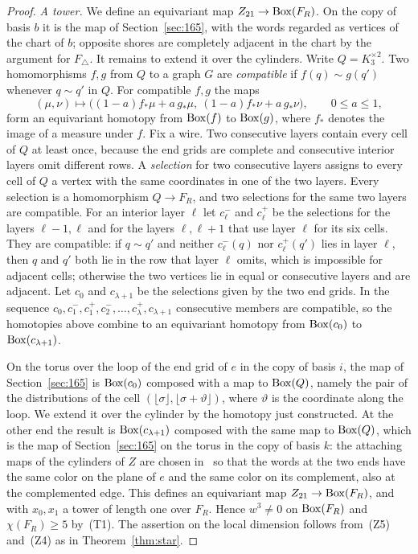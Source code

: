 \begin{proof}
\emph{A tower.} We define an equivariant map $Z_{21}\to\operatorname{Box}(F_R)$. On the copy of basis $b$ it is the map of Section~\ref{sec:165}, with the words regarded as vertices of the chart of $b$; opposite shores are completely adjacent in the chart by the argument for $F_\triangle$. It remains to extend it over the cylinders. Write $Q=K_3^{\times2}$. Two homomorphisms $f,g$ from $Q$ to a graph $G$ are \emph{compatible} if $f(q)\sim g(q')$ whenever $q\sim q'$ in $Q$. For compatible $f,g$ the maps
\[
 (\mu,\nu)\mapsto\bigl((1-a)f_*\mu+a\,g_*\mu,\ (1-a)f_*\nu+a\,g_*\nu\bigr),\qquad0\le a\le1,
\]
form an equivariant homotopy from $\operatorname{Box}(f)$ to $\operatorname{Box}(g)$, where $f_*$ denotes the image of a measure under $f$. Fix a wire. Two consecutive layers contain every cell of $Q$ at least once, because the end grids are complete and consecutive interior layers omit different rows. A \emph{selection} for two consecutive layers assigns to every cell of $Q$ a vertex with the same coordinates in one of the two layers. Every selection is a homomorphism $Q\to F_R$, and two selections for the same two layers are compatible. For an interior layer $\ell$ let $c^-_\ell$ and $c^+_\ell$ be the selections for the layers $\ell-1,\ell$ and for the layers $\ell,\ell+1$ that use layer $\ell$ for its six cells. They are compatible: if $q\sim q'$ and neither $c^-_\ell(q)$ nor $c^+_\ell(q')$ lies in layer $\ell$, then $q$ and $q'$ both lie in the row that layer $\ell$ omits, which is impossible for adjacent cells; otherwise the two vertices lie in equal or consecutive layers and are adjacent. Let $c_0$ and $c_{\lambda+1}$ be the selections given by the two end grids. In the sequence $c_0,c^-_1,c^+_1,c^-_2,\ldots,c^+_\lambda,c_{\lambda+1}$ consecutive members are compatible, so the homotopies above combine to an equivariant homotopy from $\operatorname{Box}(c_0)$ to $\operatorname{Box}(c_{\lambda+1})$.

On the torus over the loop of the end grid of $e$ in the copy of basis $i$, the map of Section~\ref{sec:165} is $\operatorname{Box}(c_0)$ composed with a map to $\operatorname{Box}(Q)$, namely the pair of the distributions of the cell $(\lfloor\sigma\rfloor,\lfloor\sigma+\vartheta\rfloor)$, where $\vartheta$ is the coordinate along the loop. We extend it over the cylinder by the homotopy just constructed. At the other end the result is $\operatorname{Box}(c_{\lambda+1})$ composed with the same map to $\operatorname{Box}(Q)$, which is the map of Section~\ref{sec:165} on the torus in the copy of basis $k$: the attaching maps of the cylinders of $Z$ are chosen in~\cite[Appendix~E]{Z} so that the words at the two ends have the same color on the plane of $e$ and the same color on its complement, also at the complemented edge. This defines an equivariant map $Z_{21}\to\operatorname{Box}(F_R)$, and with $x_0,x_1$ a tower of length one over $F_R$. Hence $w^3\ne0$ on $\operatorname{Box}(F_R)$ and $\chi(F_R)\ge5$ by~(T1). The assertion on the local dimension follows from~(Z5) and~(Z4) as in Theorem~\ref{thm:star}.
\end{proof}

